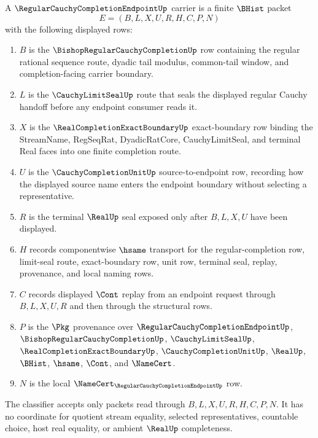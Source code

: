 \begin{definition}
\label{def:regular-cauchy-completion-endpoint-carrier}
A $\RegularCauchyCompletionEndpointUp$ carrier is a finite $\BHist$ packet
$$
E=(B,L,X,U,R,H,C,P,N)
$$
with the following displayed rows:
\begin{enumerate}
\item $B$ is the $\BishopRegularCauchyCompletionUp$ row containing the regular rational sequence route, dyadic tail modulus, common-tail window, and completion-facing carrier boundary.
\item $L$ is the $\CauchyLimitSealUp$ route that seals the displayed regular Cauchy handoff before any endpoint consumer reads it.
\item $X$ is the $\RealCompletionExactBoundaryUp$ exact-boundary row binding the StreamName, RegSeqRat, DyadicRatCore, CauchyLimitSeal, and terminal Real faces into one finite completion route.
\item $U$ is the $\CauchyCompletionUnitUp$ source-to-endpoint row, recording how the displayed source name enters the endpoint boundary without selecting a representative.
\item $R$ is the terminal $\RealUp$ seal exposed only after $B,L,X,U$ have been displayed.
\item $H$ records componentwise $\hsame$ transport for the regular-completion row, limit-seal route, exact-boundary row, unit row, terminal seal, replay, provenance, and local naming rows.
\item $C$ records displayed $\Cont$ replay from an endpoint request through $B,L,X,U,R$ and then through the structural rows.
\item $P$ is the $\Pkg$ provenance over $\RegularCauchyCompletionEndpointUp$, $\BishopRegularCauchyCompletionUp$, $\CauchyLimitSealUp$, $\RealCompletionExactBoundaryUp$, $\CauchyCompletionUnitUp$, $\RealUp$, $\BHist$, $\hsame$, $\Cont$, and $\NameCert$.
\item $N$ is the local $\NameCert_{\RegularCauchyCompletionEndpointUp}$ row.
\end{enumerate}
The classifier accepts only packets read through $B,L,X,U,R,H,C,P,N$. It has no coordinate for quotient stream equality, selected representatives, countable choice, host real equality, or ambient $\RealUp$ completeness.
\end{definition}

